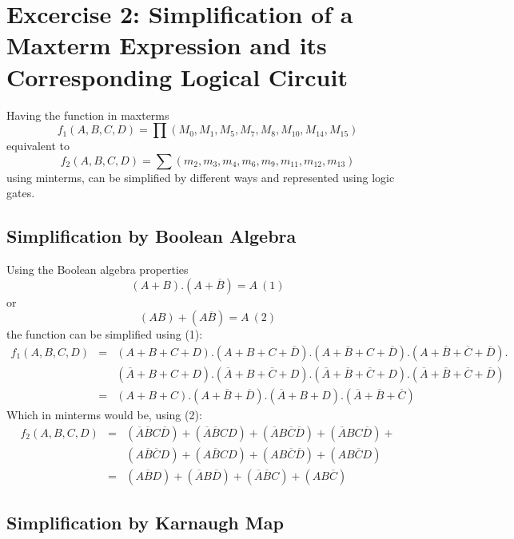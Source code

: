 \section{\color{olive}Excercise 2: Simplification of a Maxterm Expression and its Corresponding Logical Circuit}

Having the function in maxterms $$f_1 (A,B,C,D) = \prod\left(M_0, M_1 , M_5 , M_7 , M_8 , M_{10} , M_{14} , M_{15} \right)$$ equivalent to $$f_2 (A,B,C,D) = \sum\left(m_2, m_3 , m_4 , m_6 , m_9 , m_{11} , m_{12} , m_{13} \right)$$ using minterms, can be simplified by different ways and represented using logic gates.

    \subsection{\color{purple}Simplification by Boolean Algebra}

    Using the Boolean algebra properties $$(A+B).(A+\overline{B})=A~(1)$$ or $$(AB)+(A\overline{B})=A~(2)$$ the function can be simplified using (1):
    \begin{eqnarray*}
        f_1 (A,B,C,D) &= &(A+B+C+D).(A+B+C+\overline{D}).(A+\overline{B}+C+\overline{D}).(A+\overline{B}+\overline{C}+\overline{D}).\\
        &&(\overline{A}+B+C+D).(\overline{A}+B+\overline{C}+D).(\overline{A}+\overline{B}+\overline{C}+D).(\overline{A}+\overline{B}+\overline{C}+\overline{D}) \\
        &=&(A+B+C).(A+\overline{B}+\overline{D}).(\overline{A}+B+D).(\overline{A}+\overline{B}+\overline{C})
    \end{eqnarray*}
    Which in minterms would be, using (2):
    \begin{eqnarray*}
        f_2(A,B,C,D) &= &(\overline{A}\overline{B}C\overline{D})+(\overline{A}\overline{B}CD)+(\overline{A}B\overline{C}\overline{D})+(\overline{A}BC\overline{D})+\\
        &&(A\overline{B}\overline{C}D)+(A\overline{B}CD)+(AB\overline{C}\overline{D})+(AB\overline{C}D)\\
        &=&(A\overline{B}D)+(\overline{A}B\overline{D})+(\overline{A}\overline{B}C)+(AB\overline{C})
    \end{eqnarray*}

    \subsection{\color{purple}Simplification by Karnaugh Map}

